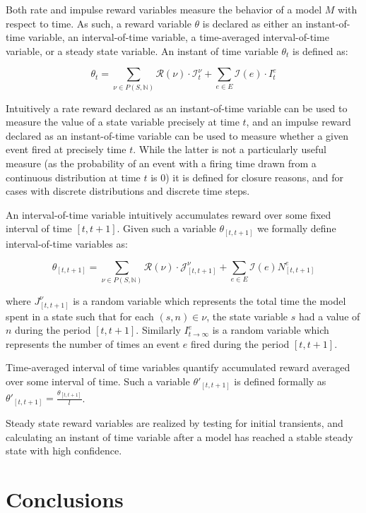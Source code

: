 \documentclass[11pt]{article}
\begin{document}
Both rate and impulse reward variables measure the behavior of a model $M$ with respect to time.  As such, a reward variable $\theta$ is declared as either an instant-of-time variable, an interval-of-time variable, a time-averaged interval-of-time variable, or a steady state variable.  An instant of time variable $\theta_t$ is defined as:

\[ \theta_t = \sum_{\nu \in P(S, \mathbb{N})} \mathcal{R}(\nu) \cdot \mathcal{I}^{\nu}_t + \sum_{e \in E} \mathcal{I}(e) \cdot I_t^e\]

Intuitively a rate reward declared as an instant-of-time variable \cite{freire1990technique} can be used to measure the value of a state variable precisely at time $t$, and an impulse reward declared as an instant-of-time variable can be used to measure whether a given event fired at precisely time $t$.  While the latter is not a particularly useful measure (as the probability of an event with a firing time drawn from a continuous distribution at time $t$ is $0$) it is defined for closure reasons, and for cases with discrete distributions and discrete time steps.

An interval-of-time variable intuitively accumulates reward over some fixed interval of time $[t, t+1]$.  Given such a variable $\theta_{[t, t+1]}$ we formally define interval-of-time variables as:

\[\theta_{[t,t+1]} = \sum_{\nu \in P(S, \mathbb{N})} \mathcal{R}(\nu) \cdot \mathcal{J}^{\nu}_{[t, t+1]} + \sum_{e \in E} \mathcal{I}(e)N^e_{[t,t+1]}\]

where $J^{\nu}_{[t,t+1]}$ is a random variable which represents the total time the model spent in a state such that for each $(s, n) \in \nu$, the state variable $s$ had a value of $n$ during the period $[t, t+1]$. Similarly $I^e_{t\rightarrow\infty}$ is a random variable which represents the number of times an event $e$ fired during the period $[t, t+1]$.

Time-averaged interval of time variables quantify accumulated reward averaged over some interval of time.  Such a variable $\theta'_{[t,t+1]}$ is defined formally as $\theta'_{[t,t+1]} = \frac{\theta_{[t,t+1]}}{l}$.

Steady state reward variables are realized by testing for initial transients, and calculating an instant of time variable after a model has reached a stable steady state with high confidence.

\section{Conclusions}
\end{document}
